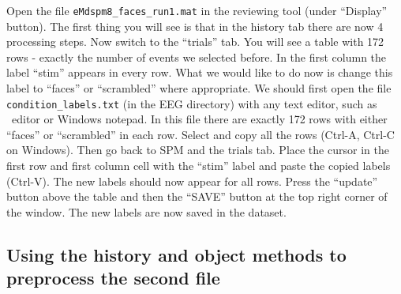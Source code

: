 Open the file \texttt{eMdspm8\_faces\_run1.mat} in the reviewing tool (under ``Display'' button). The first thing you will see is that in the history tab there are now 4 processing steps. Now switch to the ``trials'' tab. You will see a table with 172 rows - exactly the number of events we selected before. In the first column the label ``stim'' appears in every row. What we would like to do now is change this label to ``faces'' or ``scrambled'' where appropriate. We should first open the file \texttt{condition\_labels.txt} (in the EEG directory) with any text editor, such as \matlab\ editor or Windows notepad. In this file there are exactly 172 rows with either ``faces'' or ``scrambled'' in each row. Select and copy all the rows (Ctrl-A, Ctrl-C on Windows). Then go back to SPM and the trials tab. Place the cursor in the first row and first column cell with the ``stim'' label and paste the copied labels (Ctrl-V). The new labels should now appear for all rows. Press the ``update'' button above the table and then the ``SAVE'' button at the top right corner of the window. The new labels are now saved in the dataset.

\subsection{Using the history and object methods to preprocess the second file}


